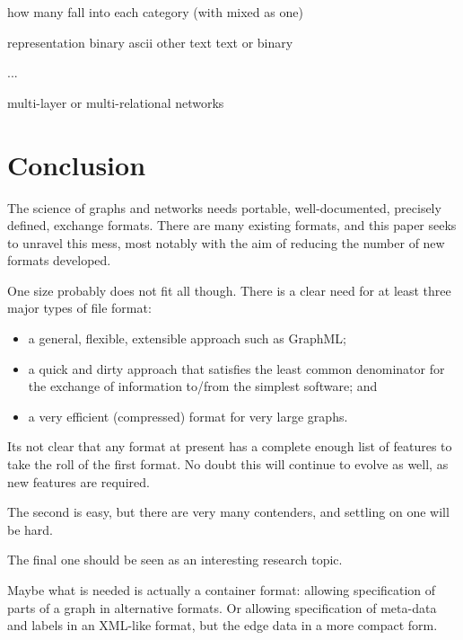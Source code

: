 \documentclass{sig-alternate}
\begin{document}
how many fall into each category (with mixed as one)

  representation
      binary
      ascii
      other text
      text or binary

  ...
 
multi-layer or multi-relational	networks	


\section{Conclusion}

The science of graphs and networks needs portable, well-documented,
precisely defined, exchange formats. There are many existing formats,
and this paper seeks to unravel this mess, most notably with the aim
of reducing the number of new formats developed.

One size probably does not fit all though.  There is a clear need for
at least three major types of file format:
\begin{itemize}

\item a general, flexible, extensible approach such as GraphML;

\item a quick and dirty approach that satisfies the least common
  denominator for the exchange of information to/from the simplest
  software; and

\item a very efficient (compressed) format for very large graphs. 

\end{itemize}

Its not clear that any format at present has a complete enough list of
features to take the roll of the first format. No doubt this will
continue to evolve as well, as new features are required.

The second is easy, but there are very many contenders, and settling
on one will be hard.

The final one should be seen as an interesting research topic. 

Maybe what is needed is actually a container format: allowing
specification of parts of a graph in alternative formats. Or allowing
specification of meta-data and labels in an XML-like format, but the
edge data in a more compact form. 






{\small  

{}
}

% 
\end{document}
